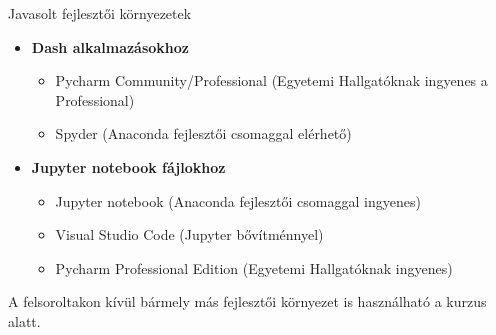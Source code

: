 \documentclass[english, aspectratio=169]{beamer}
\begin{document}
	\begin{frame}{Javasolt fejlesztői környezetek}
		\begin{itemize}
			\item \textbf{Dash alkalmazásokhoz}
			\begin{itemize}
				\item Pycharm Community/Professional (Egyetemi Hallgatóknak ingyenes a Professional)
				\item Spyder (Anaconda fejlesztői csomaggal elérhető)
			\end{itemize}
			\item \textbf{Jupyter notebook fájlokhoz}
			\begin{itemize}
				\item Jupyter notebook (Anaconda fejlesztői csomaggal ingyenes)
				\item Visual Studio Code (Jupyter bővítménnyel)
				\item Pycharm Professional Edition (Egyetemi Hallgatóknak ingyenes)
			\end{itemize}
		\end{itemize}
		\par\medskip
		A felsoroltakon kívül bármely más fejlesztői környezet is használható a kurzus alatt.
	\end{frame}
\end{document}
